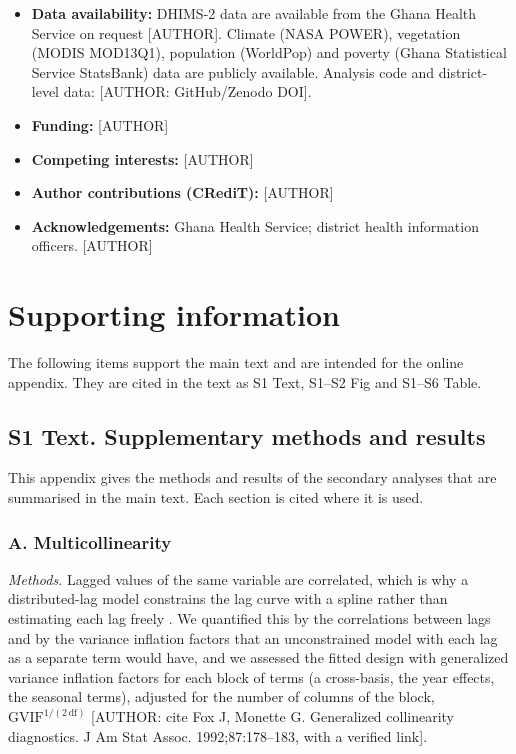 \documentclass[11pt,a4paper]{article}
\providecommand{\tightlist}{\setlength{\itemsep}{0pt}\setlength{\parskip}{0pt}}
\begin{document}
\begin{itemize}
\tightlist
\item
  \textbf{Data availability:} DHIMS-2 data are available from the Ghana Health Service on request {[}AUTHOR{]}. Climate (NASA POWER), vegetation (MODIS MOD13Q1), population (WorldPop) and poverty (Ghana Statistical Service StatsBank) data are publicly available. Analysis code and district-level data: {[}AUTHOR: GitHub/Zenodo DOI{]}.
\item
  \textbf{Funding:} {[}AUTHOR{]}
\item
  \textbf{Competing interests:} {[}AUTHOR{]}
\item
  \textbf{Author contributions (CRediT):} {[}AUTHOR{]}
\item
  \textbf{Acknowledgements:} Ghana Health Service; district health information officers. {[}AUTHOR{]}
\end{itemize}

\section*{Supporting information}

The following items support the main text and are intended for the online appendix. They are cited in the text as S1 Text, S1--S2 Fig and S1--S6 Table.

\subsection*{S1 Text. Supplementary methods and results}

This appendix gives the methods and results of the secondary analyses that are summarised in the main text. Each section is cited where it is used.

\label{s1text-a}

\subsubsection*{A. Multicollinearity}

\emph{Methods.} Lagged values of the same variable are correlated, which is why a distributed-lag model constrains the lag curve with a spline rather than estimating each lag freely \cite{ref36}. We quantified this by the correlations between lags and by the variance inflation factors that an unconstrained model with each lag as a separate term would have, and we assessed the fitted design with generalized variance inflation factors for each block of terms (a cross-basis, the year effects, the seasonal terms), adjusted for the number of columns of the block, \(\mathrm{GVIF}^{1/(2\,\mathrm{df})}\) {[}AUTHOR: cite Fox J, Monette G. Generalized collinearity diagnostics. J Am Stat Assoc. 1992;87:178--183, with a verified link{]}.
\end{document}
